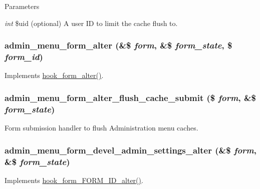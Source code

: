 \begin{DoxyParams}{Parameters}
\item[{\em int}]\$uid (optional) A user ID to limit the cache flush to. \end{DoxyParams}
\hypertarget{admin__menu_8module_a04060c85de0ebbbe01c3d5cbed3091b6}{
\subsubsection[{admin\_\-menu\_\-form\_\-alter}]{\setlength{\rightskip}{0pt plus 5cm}admin\_\-menu\_\-form\_\-alter (\&\$ {\em form}, \/  \&\$ {\em form\_\-state}, \/  \$ {\em form\_\-id})}}
\label{admin__menu_8module_a04060c85de0ebbbe01c3d5cbed3091b6}
Implements \hyperlink{group__hooks_ga6df3cea27ae1407aeef4eae5444cb213}{hook\_\-form\_\-alter()}. \hypertarget{admin__menu_8module_a0778640fb964053659420cc3cfbef413}{
\subsubsection[{admin\_\-menu\_\-form\_\-alter\_\-flush\_\-cache\_\-submit}]{\setlength{\rightskip}{0pt plus 5cm}admin\_\-menu\_\-form\_\-alter\_\-flush\_\-cache\_\-submit (\$ {\em form}, \/  \&\$ {\em form\_\-state})}}
\label{admin__menu_8module_a0778640fb964053659420cc3cfbef413}
Form submission handler to flush Administration menu caches. \hypertarget{admin__menu_8module_a2626235c2e112a1f1afe3cb3bb5d926d}{
\subsubsection[{admin\_\-menu\_\-form\_\-devel\_\-admin\_\-settings\_\-alter}]{\setlength{\rightskip}{0pt plus 5cm}admin\_\-menu\_\-form\_\-devel\_\-admin\_\-settings\_\-alter (\&\$ {\em form}, \/  \&\$ {\em form\_\-state})}}
\label{admin__menu_8module_a2626235c2e112a1f1afe3cb3bb5d926d}
Implements \hyperlink{group__hooks_ga8d4a4089551493d55911bd5c4f218264}{hook\_\-form\_\-FORM\_\-ID\_\-alter()}.

